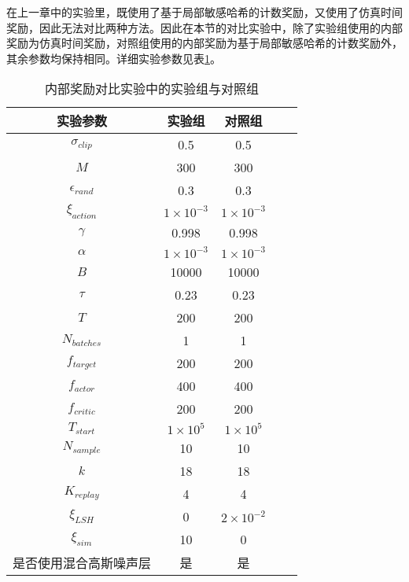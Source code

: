 在上一章中的实验里，既使用了基于局部敏感哈希的计数奖励，又使用了仿真时间奖励，因此无法对比两种方法。因此在本节的对比实验中，除了实验组使用的内部奖励为仿真时间奖励，对照组使用的内部奖励为基于局部敏感哈希的计数奖励外，其余参数均保持相同。详细实验参数见表\ref{simcmp}。
    \begin{table}[htbp]
        \caption{内部奖励对比实验中的实验组与对照组}
        \label{simcmp}
    \vspace{0.5em}\centering\wuhao
    \begin{tabular}{ccccc}
    \toprule[1.5pt]
        实验参数 & 实验组 & 对照组\\
    \midrule[1pt]
        $\sigma_{clip}$         & 0.5               & 0.5               \\
        $M$                     & 300               & 300               \\
        $\epsilon_{rand}$       & 0.3               & 0.3               \\
        $\xi_{action}$          & $1\times 10^{-3}$ & $1\times 10^{-3}$ \\
        $\gamma$                & 0.998             & 0.998             \\
        $\alpha$                & $1\times 10^{-3}$ & $1\times 10^{-3}$ \\
        $B$                     & 10000             & 10000             \\
        $\tau$                  & 0.23              & 0.23              \\
        $T$                     & 200               & 200               \\
        $N_{batches}$           & 1                 & 1                 \\
        $f_{target}$            & 200               & 200               \\
        $f_{actor}$             & 400               & 400               \\
        $f_{critic}$            & 200               & 200               \\
        $T_{start}$             & $1\times 10^5$    & $1\times 10^5$    \\
        $N_{sample}$            & 10                & 10                \\
        $k$                     & 18                & 18                \\
        $K_{replay}$            & 4                 & 4                 \\
        $\xi_{LSH}$             & 0                 & $2\times 10^{-2}$ \\
        $\xi_{sim}$             & 10                & 0                 \\
        是否使用混合高斯噪声层  & 是                & 是                \\
    \bottomrule[1.5pt]
    \end{tabular}
    \end{table}
